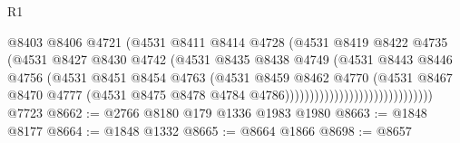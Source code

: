 \begin{lexlean}{R1}
\begin{coremodule}
                                              @8403
                                              @8406
                                              @4721
                                              (@4531
                                                @8411
                                                @8414
                                                @4728
                                                (@4531
                                                  @8419
                                                  @8422
                                                  @4735
                                                  (@4531
                                                    @8427
                                                    @8430
                                                    @4742
                                                    (@4531
                                                      @8435
                                                      @8438
                                                      @4749
                                                      (@4531
                                                        @8443
                                                        @8446
                                                        @4756
                                                        (@4531
                                                          @8451
                                                          @8454
                                                          @4763
                                                          (@4531
                                                            @8459
                                                            @8462
                                                            @4770
                                                            (@4531
                                                              @8467
                                                              @8470
                                                              @4777
                                                              (@4531
                                                                @8475
                                                                @8478
                                                                @4784
                                                                @4786))))))))))))))))))))))))))))))
    @7723
@8662 := @2766 @8180 @179 @1336 @1983 @1980
@8663 := @1848 @8177
@8664 := @1848 @1332
@8665 := @8664 @1866
@8698 := @8657

\end{coremodule}
\end{lexlean}
